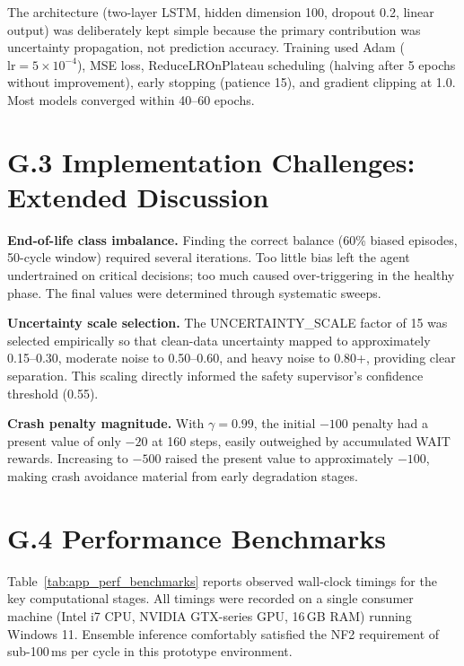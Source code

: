 \documentclass[12pt,a4paper]{report}
\begin{document}
The architecture (two-layer LSTM, hidden dimension 100, dropout 0.2, linear output) was deliberately kept simple because the primary contribution was uncertainty propagation, not prediction accuracy. Training used Adam ($\text{lr} = 5 \times 10^{-4}$), MSE loss, ReduceLROnPlateau scheduling (halving after 5 epochs without improvement), early stopping (patience 15), and gradient clipping at 1.0. Most models converged within 40--60 epochs.

\section*{G.3 Implementation Challenges: Extended Discussion}

\textbf{End-of-life class imbalance.} Finding the correct balance (60\% biased episodes, 50-cycle window) required several iterations. Too little bias left the agent undertrained on critical decisions; too much caused over-triggering in the healthy phase. The final values were determined through systematic sweeps.

\textbf{Uncertainty scale selection.} The UNCERTAINTY\_SCALE factor of 15 was selected empirically so that clean-data uncertainty mapped to approximately 0.15--0.30, moderate noise to 0.50--0.60, and heavy noise to 0.80+, providing clear separation. This scaling directly informed the safety supervisor's confidence threshold (0.55).

\textbf{Crash penalty magnitude.} With $\gamma = 0.99$, the initial $-100$ penalty had a present value of only $-20$ at 160 steps, easily outweighed by accumulated WAIT rewards. Increasing to $-500$ raised the present value to approximately $-100$, making crash avoidance material from early degradation stages.

\section*{G.4 Performance Benchmarks}

Table~\ref{tab:app_perf_benchmarks} reports observed wall-clock timings for the key computational stages. All timings were recorded on a single consumer machine (Intel i7 CPU, NVIDIA GTX-series GPU, 16\,GB RAM) running Windows 11. Ensemble inference comfortably satisfied the NF2 requirement of sub-100\,ms per cycle in this prototype environment.
\end{document}
